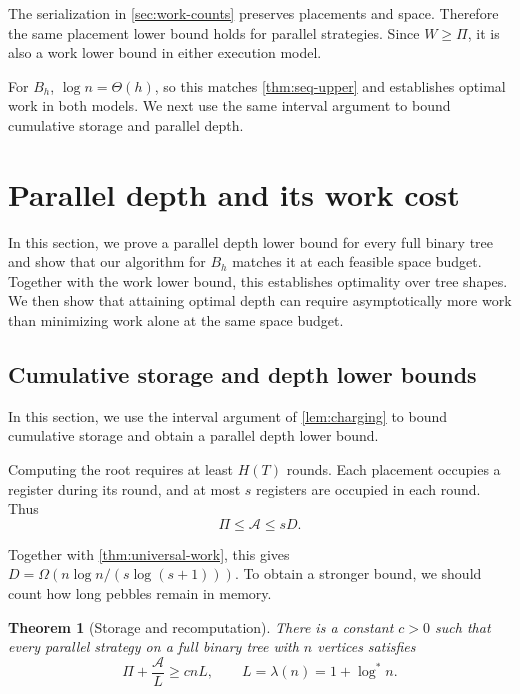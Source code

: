 \documentclass[11pt]{article}
\newtheorem{theorem}{Theorem}[section]
\theoremstyle{definition}
\theoremstyle{remark}
\newcommand{\Area}{\mathcal A}
\begin{document}
The serialization in \cref{sec:work-counts} preserves placements
and space. Therefore the same placement lower bound holds for
parallel strategies. Since $W\ge\Pi$, it is also a work lower
bound in either execution model.

For $B_h$, $\log n=\Theta(h)$, so this matches
\cref{thm:seq-upper} and establishes optimal work in both models.
We next use the same interval argument to bound cumulative
storage and parallel depth.

\section{Parallel depth and its work cost}
\label{sec:parallel-lower}

In this section, we prove a parallel depth lower bound for every full binary tree and show that our algorithm for $B_h$ matches it at each feasible space budget. Together with the work lower bound, this establishes optimality over tree shapes. We then show that attaining optimal depth can require asymptotically more work than minimizing work alone at the same space budget.

\subsection{Cumulative storage and depth lower bounds}
\label{sec:area}

In this section, we use the interval argument of \cref{lem:charging} to bound cumulative storage and obtain a parallel depth lower bound.

Computing the root requires at least $H(T)$ rounds.
Each placement occupies a register during its round, and at most
$s$ registers are occupied in each round. Thus
\begin{equation}
\Pi\le\Area\le sD.
\label{eq:capacity}
\end{equation}

Together with \cref{thm:universal-work}, this gives
$D=\Omega(n\log n/(s\log(s+1)))$.
To obtain a stronger bound, we should count how long pebbles remain
in memory.

\begin{theorem}[Storage and recomputation]
\label{thm:weighted}
There is a constant $c>0$ such that every parallel strategy on a full binary tree with $n$ vertices satisfies
\begin{equation}
\Pi+\frac{\Area}{L}\ge cnL, \qquad L=\lambda(n)=1+\log^*n.
\label{eq:weighted}
\end{equation}
\end{theorem}
\end{document}
